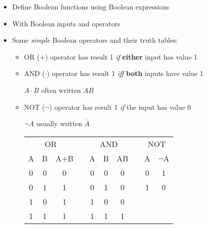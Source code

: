 \BNotes\ifnum{}
\fi
\begin{frame}[fragile]
\begin{itemize}
\item Define Boolean functions using Boolean expressions 
    \item With Boolean inputs and operators
    \item Some \textit{simple} Boolean operators and their truth tables:
\begin{itemize}
	\item OR ($+$) operator has result 1 \textit{if} \textbf{either} input has value 1
	\item AND ($\cdot$) operator has result 1 \textit{iff} \textbf{both} inputs have value 1
	
		{\footnotesize $A\cdot B$ often written $AB$}
	\item NOT ($\lnot$) operator has result 1 \textit{if} the input has
		value 0

		{\footnotesize $\lnot A$ usually written $\bar A$}

	\begin{center}
	\begin{tabular}{|c|c||c|c|c|c||c|c|c||c|}\cline{1-3}\cline{5-7}\cline{9-10} 
	\multicolumn{3}{|c|}{OR}& &\multicolumn{3}{|c|}{AND}& &\multicolumn{2}{|c|}{NOT}\\\cline{1-3}\cline{5-7}\cline{9-10}
	A & B & A+B & & A & B & AB & & A & $\lnot$A \\\cline{1-3}\cline{5-7}\cline{9-10}
	0 & 0 & 0   & & 0 & 0 & 0  & & 0 & 1 \\\cline{1-3}\cline{5-7}\cline{9-10}
	0 & 1 & 1   & & 0 & 1 & 0  & & 1 & 0 \\\cline{1-3}\cline{5-7}\cline{9-10}
	1 & 0 & 1   & & 1 & 0 & 0 \\\cline{1-3}\cline{5-7}
	1 & 1 & 1   & & 1 & 1 & 1 \\\cline{1-3}\cline{5-7}
	\end{tabular}
	\end{center}
\end{itemize}
\end{itemize}
\end{frame}

